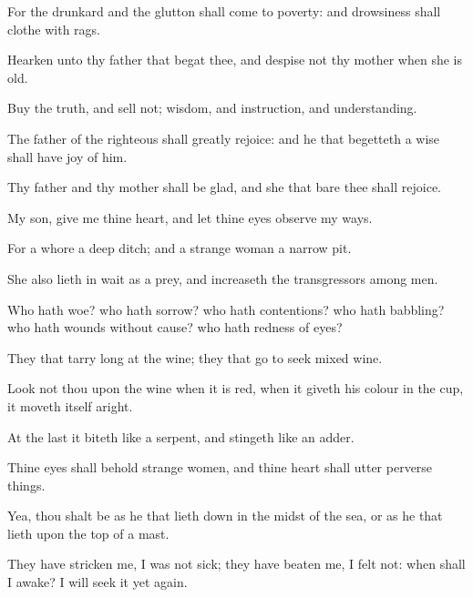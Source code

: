 {For the
drunkard and the
glutton shall come to
poverty: and
drowsiness shall
clothe
{} with
rags.

Hearken unto thy
father that
begat thee, and
despise not thy
mother when she is
old.

Buy the
truth, and
sell
{} not;
{}
wisdom, and
instruction, and
understanding.

The
father of the
righteous shall
greatly
rejoice: and he that
begetteth a
wise
{} shall have
joy of him.

Thy
father and thy
mother shall be
glad, and she that
bare thee shall
rejoice.

My
son,
give me thine
heart, and let thine
eyes
observe my
ways.

For a
whore
{} a
deep
ditch; and a strange
woman
{} a
narrow
pit.

She also lieth in
wait as
{} a
prey, and
increaseth the
transgressors among
men.


\par }{\PP {}Who hath
woe? who hath
sorrow? who hath
contentions? who hath
babbling? who hath
wounds without
cause? who hath
redness of
eyes?

They that tarry
long at the
wine; they that
go to
seek mixed
wine.

Look not thou upon the
wine when it is
red, when it
giveth his
colour in the
cup,
{} it
moveth itself
aright.

At the
last it
biteth like a
serpent, and
stingeth like an
adder.

Thine
eyes shall
behold strange
women, and thine
heart shall
utter perverse
things.

Yea, thou shalt be as he that lieth
down in the
midst of the
sea, or as he that
lieth upon the
top of a
mast.

They have
stricken me,
{} I was not
sick; they have
beaten me,
{} I
felt
{} not: when shall I
awake? I will
seek it
yet again.




\par }

